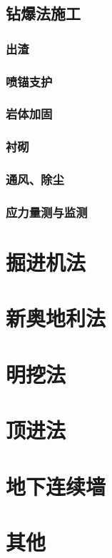 \documentclass[UTF8]{../../ApplicationUniverse}
\begin{document}
    \subsection{钻爆法施工}
        \subsubsection{出渣}
        \subsubsection{喷锚支护}
        \subsubsection{岩体加固}
        \subsubsection{衬砌}
        \subsubsection{通风、除尘}
        \subsubsection{应力量测与监测}
\section{掘进机法}
\section{新奥地利法}
\section{明挖法}
\section{顶进法}
\section{地下连续墙}
\section{其他}
\end{document}
